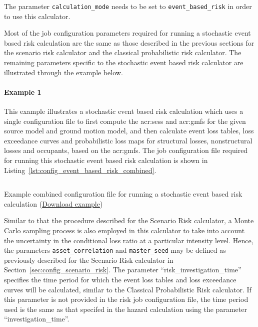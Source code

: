 The parameter \Verb+calculation_mode+ needs to be set to
\Verb+event_based_risk+ in order to use this calculator.

Most of the job configuration parameters required for running a stochastic
event based risk calculation are the same as those described in the previous
sections for the scenario risk calculator and the classical probabilistic risk
calculator. The remaining parameters specific to the stochastic event based
risk calculator are illustrated through the example below.


\paragraph{Example 1}

This example illustrates a stochastic event based risk calculation which uses
a single configuration file to first compute the \glspl{acr:ses} and
\glspl{acr:gmf} for the given source model and ground motion model, and then
calculate event loss tables, loss exceedance curves and probabilistic
loss maps for structural losses, nonstructural losses and occupants,
based on the \glspl{acr:gmf}. The job configuration file required for
running this stochastic event based risk calculation is shown in
Listing~\ref{lst:config_event_based_risk_combined}.

\begin{listing}[htbp]
  \inputminted[firstline=1,firstnumber=1,fontsize=\scriptsize
  ,frame=single,bgcolor=lightgray,linenos,label=job.ini]{ini}{oqum/risk/verbatim/config_event_based_risk_combined.ini}
  \caption{Example combined configuration file for running a stochastic event based risk calculation (\href{https://raw.githubusercontent.com/gem/oq-engine/master/doc/manual/oqum/risk/verbatim/config_event_based_risk_combined.ini}{Download example})}
  \label{lst:config_event_based_risk_combined}
\end{listing}

Similar to that the procedure described for the Scenario Risk calculator, a
Monte Carlo sampling process is also employed in this calculator to take into
account the uncertainty in the conditional loss ratio at a particular
intensity level. Hence, the parameters \Verb+asset_correlation+ and
\Verb+master_seed+ may be defined as previously described for the Scenario
Risk calculator in Section~\ref{sec:config_scenario_risk}. The parameter
``risk\_investigation\_time'' specifies the time period for which the event
loss tables and loss exceedance curves will be calculated, similar to the
Classical Probabilistic Risk calculator. If this parameter is not provided in
the risk job configuration file, the time period used is the same as that
specifed in the hazard calculation using the parameter ``investigation\_time''.

